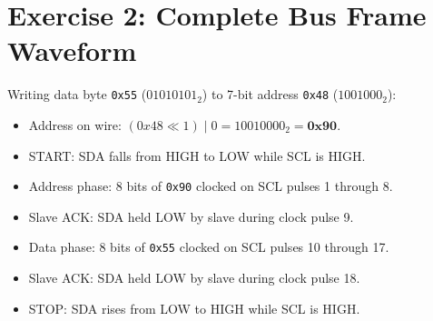\documentclass[11pt,a4paper,oneside]{report}
\begin{document}
\section{Exercise 2: Complete Bus Frame Waveform}
Writing data byte \texttt{0x55} ($01010101_2$) to 7-bit address \texttt{0x48} ($1001000_2$):
\begin{itemize}
    \item Address on wire: $(0x48 \ll 1) \;|\; 0 = 10010000_2 = \mathbf{0x90}$.
    \item START: SDA falls from HIGH to LOW while SCL is HIGH.
    \item Address phase: 8 bits of \texttt{0x90} clocked on SCL pulses 1 through 8.
    \item Slave ACK: SDA held LOW by slave during clock pulse 9.
    \item Data phase: 8 bits of \texttt{0x55} clocked on SCL pulses 10 through 17.
    \item Slave ACK: SDA held LOW by slave during clock pulse 18.
    \item STOP: SDA rises from LOW to HIGH while SCL is HIGH.
\end{itemize}
\end{document}
